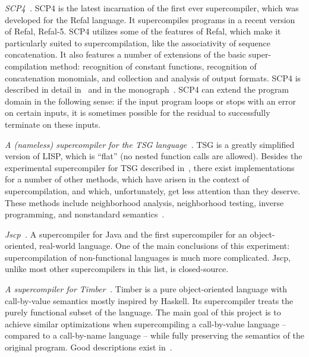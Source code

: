 \begin{longitem}

\item \emph{SCP4~\cite{Scp4Url}.} SCP4 
is the latest incarnation of the first ever supercompiler, which was
developed for the Refal language. 
It supercompiles programs in a recent version of Refal, Refal-5.
SCP4 utilizes some of the features of Refal, which make it particularly
suited to supercompilation, like the associativity of sequence concatenation.
It also features a number of extensions of the basic super-compilation method:
recognition of constant functions,
recognition of concatenation monomials, and
collection and analysis of output formats.
SCP4 is described in detail in~\cite{Nemytykh2008PhD} and in the monograph~\cite{Nemytykh2007SCP4}.
SCP4 can extend the program domain in the following sense:
if the input program loops or stops with an error on certain inputs,
it is sometimes possible for the residual to successfully terminate on these inputs.

\item \emph{A (nameless) supercompiler for the  TSG language~\cite{TsgUrl}.} TSG 
    is a greatly simplified version of LISP, which is ``flat'' (no nested function calls are allowed).
Besides the experimental supercompiler for TSG described in~\cite{Abramov2006meta2},
there exist implementations for a number of other methods, which have arisen 
in the context of supercompilation, and which, unfortunately, get less attention
than they deserve.
These methods include neighborhood analysis, neighborhood testing, inverse programming, and
nonstandard semantics~\cite{Abramov1995meta}.

\item \emph{Jscp\cite{Klimov2008Jscp}~\cite{JscpUrl}.} A supercompiler for Java and
the first supercompiler for an object-oriented, real-world language.
One of the main conclusions of this experiment: supercompilation of
non-functional languages is much more complicated.
Jscp, unlike most other supercompilers in this list, is closed-source.

\item \emph{A supercompiler for Timber~\cite{TimberUrl}.} Timber 
is a pure object-oriented language with call-by-value semantics mostly inspired by Haskell.
Its supercompiler treats the purely functional subset of the language.
The main goal of this project is to achieve similar optimizations 
when supercompiling a call-by-value language -- compared to a call-by-name language --
while fully preserving the semantics of the original program.
Good descriptions exist in~\cite{Jonsson2008Supercompilation,Jonsson2011Phd}.


\end{longitem}

